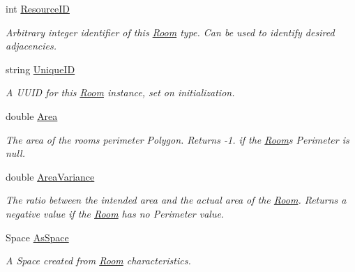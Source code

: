 \begin{DoxyCompactItemize}
int \mbox{\hyperlink{class_room_kit_1_1_room_ac33f1b7a0a0b1c42c3665068ea77cb89}{Resource\+ID}}
\begin{DoxyCompactList}\small\item\em Arbitrary integer identifier of this \mbox{\hyperlink{class_room_kit_1_1_room}{Room}} type. Can be used to identify desired adjacencies. \end{DoxyCompactList}\item 
string \mbox{\hyperlink{class_room_kit_1_1_room_a767254e52c6f4c84fdafa1cc1833cfcd}{Unique\+ID}}
\begin{DoxyCompactList}\small\item\em A U\+U\+ID for this \mbox{\hyperlink{class_room_kit_1_1_room}{Room}} instance, set on initialization. \end{DoxyCompactList}\item 
double \mbox{\hyperlink{class_room_kit_1_1_room_ad4567c8d712d9e6215bda0887148c4d7}{Area}}
\begin{DoxyCompactList}\small\item\em The area of the room\textquotesingle{}s perimeter Polygon. Returns -\/1. if the \mbox{\hyperlink{class_room_kit_1_1_room}{Room}}\textquotesingle{}s Perimeter is null. \end{DoxyCompactList}\item 
double \mbox{\hyperlink{class_room_kit_1_1_room_a236fb97b3f1d4275ba76da3523f94775}{Area\+Variance}}
\begin{DoxyCompactList}\small\item\em The ratio between the intended area and the actual area of the \mbox{\hyperlink{class_room_kit_1_1_room}{Room}}. Returns a negative value if the \mbox{\hyperlink{class_room_kit_1_1_room}{Room}} has no Perimeter value. \end{DoxyCompactList}\item 
Space \mbox{\hyperlink{class_room_kit_1_1_room_ada0a8548f538069f902f76534eb91899}{As\+Space}}
\begin{DoxyCompactList}\small\item\em A Space created from \mbox{\hyperlink{class_room_kit_1_1_room}{Room}} characteristics. \end{DoxyCompactList}\end{DoxyCompactItemize}



